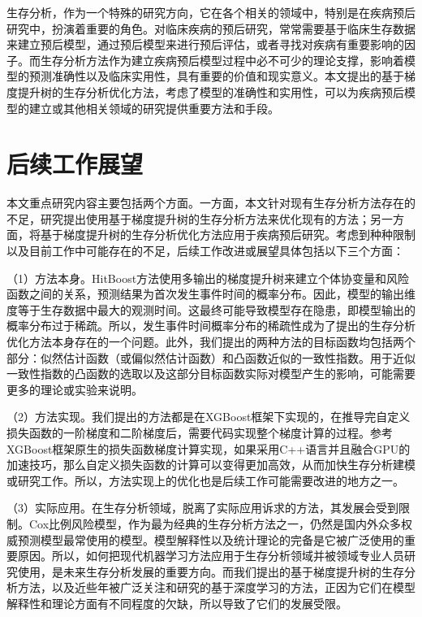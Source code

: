 生存分析，作为一个特殊的研究方向，它在各个相关的领域中，特别是在疾病预后研究中，扮演着重要的角色。对临床疾病的预后研究，常常需要基于临床生存数据来建立预后模型，通过预后模型来进行预后评估，或者寻找对疾病有重要影响的因子。而生存分析方法作为建立疾病预后模型过程中必不可少的理论支撑，影响着模型的预测准确性以及临床实用性，具有重要的价值和现实意义。本文提出的基于梯度提升树的生存分析优化方法，考虑了模型的准确性和实用性，可以为疾病预后模型的建立或其他相关领域的研究提供重要方法和手段。

\section{后续工作展望}
本文重点研究内容主要包括两个方面。一方面，本文针对现有生存分析方法存在的不足，研究提出使用基于梯度提升树的生存分析方法来优化现有的方法；另一方面，将基于梯度提升树的生存分析优化方法应用于疾病预后研究。考虑到种种限制以及目前工作中可能存在的不足，后续工作改进或展望具体包括以下三个方面：

（1）方法本身。HitBoost方法使用多输出的梯度提升树来建立个体协变量和风险函数之间的关系，预测结果为首次发生事件时间的概率分布。因此，模型的输出维度等于生存数据中最大的观测时间。这最终可能导致模型存在隐患，即模型输出的概率分布过于稀疏。所以，发生事件时间概率分布的稀疏性成为了提出的生存分析优化方法本身存在的一个问题。此外，我们提出的两种方法的目标函数均包括两个部分：似然估计函数（或偏似然估计函数）和凸函数近似的一致性指数。用于近似一致性指数的凸函数的选取以及这部分目标函数实际对模型产生的影响，可能需要更多的理论或实验来说明。

（2）方法实现。我们提出的方法都是在XGBoost框架下实现的，在推导完自定义损失函数的一阶梯度和二阶梯度后，需要代码实现整个梯度计算的过程。参考XGBoost框架原生的损失函数梯度计算实现，如果采用C++语言并且融合GPU的加速技巧，那么自定义损失函数的计算可以变得更加高效，从而加快生存分析建模或研究工作。所以，方法实现上的优化也是后续工作可能需要改进的地方之一。

（3）实际应用。在生存分析领域，脱离了实际应用诉求的方法，其发展会受到限制。Cox比例风险模型，作为最为经典的生存分析方法之一，仍然是国内外众多权威预测模型最常使用的模型。模型解释性以及统计理论的完备是它被广泛使用的重要原因。所以，如何把现代机器学习方法应用于生存分析领域并被领域专业人员研究使用，是未来生存分析发展的重要方向。而我们提出的基于梯度提升树的生存分析方法，以及近些年被广泛关注和研究的基于深度学习的方法，正因为它们在模型解释性和理论方面有不同程度的欠缺，所以导致了它们的发展受限。
